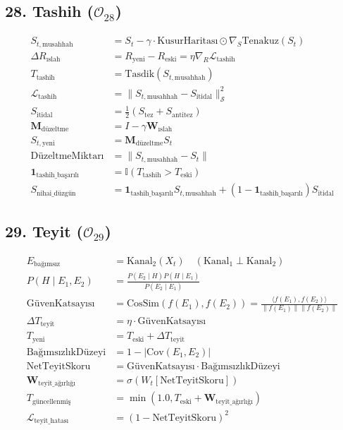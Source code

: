 \documentclass[11pt, a4paper]{article}
\begin{document}
\subsection{28. Tashih ($\mathcal{O}_{28}$)}
\begin{align}
S_{t, \text{musahhah}} &= S_t - \gamma \cdot \text{KusurHaritası} \odot \nabla_{S} \text{Tenakuz}(S_t) \\
\Delta R_{\text{ıslah}} &= R_{\text{yeni}} - R_{\text{eski}} = \eta \nabla_R \mathcal{L}_{\text{tashih}} \\
T_{\text{tashih}} &= \text{Tasdik}(S_{t, \text{musahhah}}) \\
\mathcal{L}_{\text{tashih}} &= \| S_{t, \text{musahhah}} - S_{\text{itidal}} \|_{\mathcal{S}}^2 \\
S_{\text{itidal}} &= \frac{1}{2} (S_{\text{tez}} + S_{\text{antitez}}) \\
\mathbf{M}_{\text{düzeltme}} &= I - \gamma \mathbf{W}_{\text{ıslah}} \\
S_{t, \text{yeni}} &= \mathbf{M}_{\text{düzeltme}} S_t \\
\text{DüzeltmeMiktarı} &= \|S_{t, \text{musahhah}} - S_t\| \\
\mathbf{1}_{\text{tashih\_başarılı}} &= \mathbb{I}(T_{\text{tashih}} > T_{\text{eski}}) \\
S_{\text{nihai\_düzgün}} &= \mathbf{1}_{\text{tashih\_başarılı}} S_{t, \text{musahhah}} + (1 - \mathbf{1}_{\text{tashih\_başarılı}}) S_{\text{itidal}}
\end{align}

\subsection{29. Teyit ($\mathcal{O}_{29}$)}
\begin{align}
E_{\text{bağımsız}} &= \text{Kanal}_2(X_t) \quad (\text{Kanal}_1 \perp \text{Kanal}_2) \\
P(H \mid E_1, E_2) &= \frac{P(E_2 \mid H) P(H \mid E_1)}{P(E_2 \mid E_1)} \\
\text{GüvenKatsayısı} &= \text{CosSim}(f(E_1), f(E_2)) = \frac{\langle f(E_1), f(E_2) \rangle}{\|f(E_1)\| \|f(E_2)\|} \\
\Delta T_{\text{teyit}} &= \eta \cdot \text{GüvenKatsayısı} \\
T_{\text{yeni}} &= T_{\text{eski}} + \Delta T_{\text{teyit}} \\
\text{BağımsızlıkDüzeyi} &= 1 - |\text{Cov}(E_1, E_2)| \\
\text{NetTeyitSkoru} &= \text{GüvenKatsayısı} \cdot \text{BağımsızlıkDüzeyi} \\
\mathbf{W}_{\text{teyit\_ağırlığı}} &= \sigma(W_t [\text{NetTeyitSkoru}]) \\
T_{\text{güncellenmiş}} &= \min(1.0, T_{\text{eski}} + \mathbf{W}_{\text{teyit\_ağırlığı}}) \\
\mathcal{L}_{\text{teyit\_hatası}} &= (1 - \text{NetTeyitSkoru})^2
\end{align}
\end{document}
